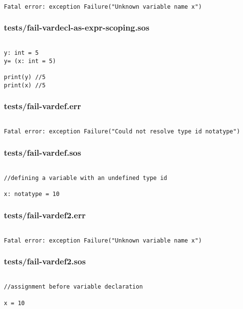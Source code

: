 \documentclass[main.tex]{subfiles}
\begin{document}
\begin{lstlisting}

Fatal error: exception Failure("Unknown variable name x")
\end{lstlisting}

\subsubsection{tests/fail-vardecl-as-expr-scoping.sos}

\begin{lstlisting}

y: int = 5 
y= (x: int = 5)

print(y) //5 
print(x) //5 
\end{lstlisting}

\subsubsection{tests/fail-vardef.err}

\begin{lstlisting}

Fatal error: exception Failure("Could not resolve type id notatype")
\end{lstlisting}

\subsubsection{tests/fail-vardef.sos}

\begin{lstlisting}

//defining a variable with an undefined type id

x: notatype = 10
\end{lstlisting}

\subsubsection{tests/fail-vardef2.err}

\begin{lstlisting}

Fatal error: exception Failure("Unknown variable name x")
\end{lstlisting}

\subsubsection{tests/fail-vardef2.sos}

\begin{lstlisting}

//assignment before variable declaration

x = 10
\end{lstlisting}
\end{document}
